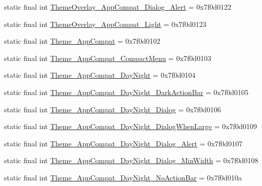 \begin{DoxyCompactItemize}
\item 
static final int \mbox{\hyperlink{classcom_1_1synnapps_1_1carouselview_1_1_r_1_1style_a18fbe7e87320ffea49c4efbdf6c80c14}{Theme\+Overlay\+\_\+\+App\+Compat\+\_\+\+Dialog\+\_\+\+Alert}} = 0x7f0d0122
\item 
static final int \mbox{\hyperlink{classcom_1_1synnapps_1_1carouselview_1_1_r_1_1style_a5730f8882dc9c07a5ee4423a40ed6c45}{Theme\+Overlay\+\_\+\+App\+Compat\+\_\+\+Light}} = 0x7f0d0123
\item 
static final int \mbox{\hyperlink{classcom_1_1synnapps_1_1carouselview_1_1_r_1_1style_a3c2e222d4f987724e012285978cf211f}{Theme\+\_\+\+App\+Compat}} = 0x7f0d0102
\item 
static final int \mbox{\hyperlink{classcom_1_1synnapps_1_1carouselview_1_1_r_1_1style_a2840e4853784a86fb4e1467f83b9d051}{Theme\+\_\+\+App\+Compat\+\_\+\+Compact\+Menu}} = 0x7f0d0103
\item 
static final int \mbox{\hyperlink{classcom_1_1synnapps_1_1carouselview_1_1_r_1_1style_a70e48d508025ca89775685145fb26780}{Theme\+\_\+\+App\+Compat\+\_\+\+Day\+Night}} = 0x7f0d0104
\item 
static final int \mbox{\hyperlink{classcom_1_1synnapps_1_1carouselview_1_1_r_1_1style_a581e2e395f5271f05f3a5f8adbe26181}{Theme\+\_\+\+App\+Compat\+\_\+\+Day\+Night\+\_\+\+Dark\+Action\+Bar}} = 0x7f0d0105
\item 
static final int \mbox{\hyperlink{classcom_1_1synnapps_1_1carouselview_1_1_r_1_1style_a43962493713f1a738715cdfbee5d9d84}{Theme\+\_\+\+App\+Compat\+\_\+\+Day\+Night\+\_\+\+Dialog}} = 0x7f0d0106
\item 
static final int \mbox{\hyperlink{classcom_1_1synnapps_1_1carouselview_1_1_r_1_1style_abe087d98e98a77b57bf3141dba60ace7}{Theme\+\_\+\+App\+Compat\+\_\+\+Day\+Night\+\_\+\+Dialog\+When\+Large}} = 0x7f0d0109
\item 
static final int \mbox{\hyperlink{classcom_1_1synnapps_1_1carouselview_1_1_r_1_1style_a197d21c44cf6f6fd924ef7b18b611d4b}{Theme\+\_\+\+App\+Compat\+\_\+\+Day\+Night\+\_\+\+Dialog\+\_\+\+Alert}} = 0x7f0d0107
\item 
static final int \mbox{\hyperlink{classcom_1_1synnapps_1_1carouselview_1_1_r_1_1style_a02fd8083a51e9a31e83815e2a9af278c}{Theme\+\_\+\+App\+Compat\+\_\+\+Day\+Night\+\_\+\+Dialog\+\_\+\+Min\+Width}} = 0x7f0d0108
\item 
static final int \mbox{\hyperlink{classcom_1_1synnapps_1_1carouselview_1_1_r_1_1style_a20d6879d2be2796b3069d2460800f57c}{Theme\+\_\+\+App\+Compat\+\_\+\+Day\+Night\+\_\+\+No\+Action\+Bar}} = 0x7f0d010a

\end{DoxyCompactItemize}
